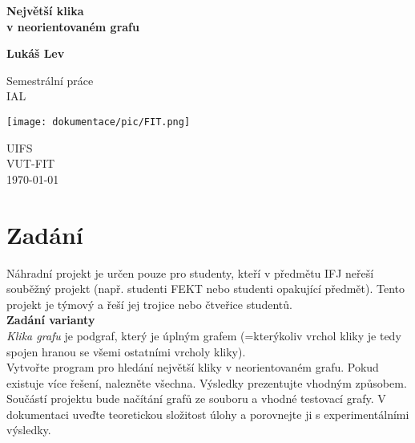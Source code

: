 \documentclass[a4paper]{article}
\begin{document}
\begin{titlepage}
    \begin{center}
        \vspace*{1cm}
            
        \Huge
        \textbf{Největší klika\\v neorientovaném grafu}
            
        \vspace{0.5cm}
        \LARGE
            
        \vspace{1.5cm}
            
        \textbf{Lukáš Lev}
            
        \vfill
            
        Semestrální práce\\
        IAL
            
        \vspace{0.8cm}
            
        \texttt{[image: dokumentace/pic/FIT.png]}
            
        \Large
        UIFS\\
        VUT-FIT\\
        \today
            
    \end{center}
\end{titlepage}
\newpage

\section{Zadání} \label{sec:zadani}
    Náhradní projekt je určen pouze pro studenty, kteří v předmětu IFJ neřeší souběžný projekt (např. studenti FEKT nebo studenti opakující předmět). Tento projekt je týmový a řeší jej trojice nebo čtveřice studentů.\\
    
    \noindent
    \textbf{Zadání varianty}\\
    \textit{Klika grafu} je podgraf, který je úplným grafem (=kterýkoliv vrchol kliky je tedy spojen hranou se všemi ostatními vrcholy kliky).\\
    \noindent
    Vytvořte program pro hledání největší kliky v neorientovaném grafu. Pokud existuje více řešení, nalezněte všechna. Výsledky prezentujte vhodným způsobem. Součástí projektu bude načítání grafů ze souboru a vhodné testovací grafy. V dokumentaci uveďte teoretickou složitost úlohy a porovnejte ji s experimentálními výsledky.\\
    
\end{document}
